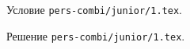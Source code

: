\problem
Условие \texttt{pers-combi/junior/1.tex}.

\solution Решение \texttt{pers-combi/junior/1.tex}.
\endproblem

